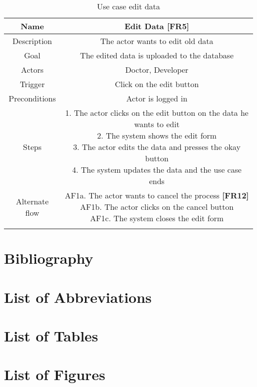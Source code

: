 \begin{table}[H]
	\begin{center}\scriptsize
		\begin{tabular}{ |c|c| }
			\hline
			Name & Edit Data \textbf{[FR5]} \\ 
			\hline	
			Description & The actor wants to edit old data \\ 
			\hline
			Goal & The edited data is uploaded to the database \\ 
			\hline
			Actors & Doctor, Developer \\ 
			\hline
			Trigger & Click on the edit button \\ 
			\hline
			Preconditions & Actor is logged in \\ 
			\hline
			Steps & \parbox{9cm}{\vspace{.5\baselineskip}
				1. The actor clicks on the edit button on the data he wants to edit\\
				2. The system shows the edit form\\
				3. The actor edits the data and presses the okay button\\
				4. The system updates the data and the use case ends
			}\\
			\hline
			Alternate flow & \parbox{9cm}{\vspace{.5\baselineskip}
				AF1a. The actor wants to cancel the process \textbf{[FR12]}\\
				AF1b. The actor clicks on the cancel button\\
				AF1c. The system closes the edit form}\\ \\ 
			\hline
		\end{tabular}
	\end{center}\normalsize
	\caption{Use case edit data}
\end{table}
\chapter{Bibliography}

\chapter{List of Abbreviations}

\chapter{List of Tables}

\chapter{List of Figures}
